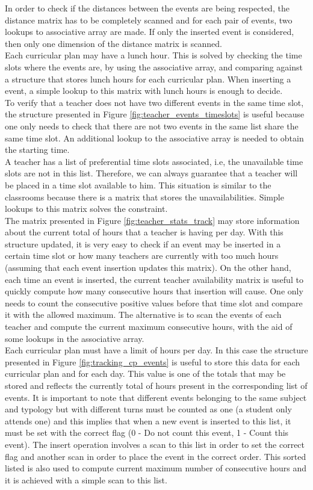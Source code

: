 In order to check if the distances between the events are being respected, the distance matrix has to be completely scanned and for each pair of events, two lookups to associative array are made. If only the inserted event is considered, then only one dimension of the distance matrix is scanned.\\
Each curricular plan may have a lunch hour. This is solved by checking the time slots where the events are, by using the associative array, and comparing against a structure that stores lunch hours for each curricular plan. When inserting a event, a simple lookup to this matrix with lunch hours is enough to decide. \\
To verify that a teacher does not have two different events in the same time slot, the structure presented in Figure \ref{fig:teacher_events_timeslots} is useful because one only needs to check that there are not two events in the same list share the same time slot. An additional lookup to the associative array is needed to obtain the starting time. \\
A teacher has a list of preferential time slots associated, i.e, the unavailable time slots are not in this list. Therefore, we can always guarantee that a teacher will be placed in a time slot available to him. This situation is similar to the classrooms because there is a matrix that stores the unavailabilities. Simple lookups to this matrix solves the constraint. \\
The matrix presented in Figure \ref{fig:teacher_stats_track} may store information about the current total of hours that a teacher is having per day. With this structure updated, it is very easy to check if an event may be inserted in a certain time slot or how many teachers are currently with too much hours (assuming that each event insertion updates this matrix). On the other hand, each time an event is inserted, the current teacher availability matrix is useful to quickly compute how many consecutive hours that insertion will cause. One only needs to count the consecutive positive values before that time slot and compare it with the allowed maximum. The alternative is to scan the events of each teacher and compute the current maximum consecutive hours, with the aid of some lookups in the associative array.\\
Each curricular plan must have a limit of hours per day. In this case the structure presented in Figure \ref{fig:tracking_cp_events} is useful to store this data for each curricular plan and for each day. This value is one of the totals that may be stored and reflects the currently total of hours present in the corresponding list of events. It is important to note that different events belonging to the same subject and typology but with different turns must be counted as one (a student only attends one) and this implies that when a new event is inserted to this list, it must be set with the correct flag (0 - Do not count this event, 1 - Count this event). The insert operation involves a scan to this list in order to set the correct flag and another scan in order to place the event in the correct order. This sorted listed is also used to compute current maximum number of consecutive hours and it is achieved with a simple scan to this list.

